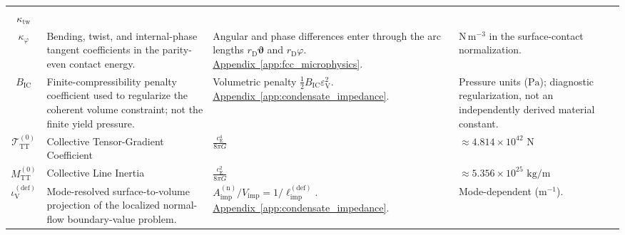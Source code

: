 \begin{longtable}{@{} c p{5.5cm} p{4cm} p{3.5cm} @{}}
\begin{tabular}[c]{@{}c@{}}$\kappa_{\mathrm b}$ \\ $\kappa_{\mathrm{tw}}$ \\ $\kappa_\varphi$\end{tabular} & {\raggedright Bending, twist, and internal-phase tangent coefficients in the parity-even contact energy.\par} & {\raggedright Angular and phase differences enter through the arc lengths $r_{\mathrm D}\boldsymbol\vartheta$ and $r_{\mathrm D}\varphi$. \newline \hyperref[app:fcc_microphysics]{Appendix~\ref*{app:fcc_microphysics}}.\par} & {\raggedright $\mathrm{N\,m^{-3}}$ in the surface-contact normalization.\par} \\

$B_{\mathrm{IC}}$ & {\raggedright Finite-compressibility penalty coefficient used to regularize the coherent volume constraint; not the finite yield pressure.\par} & {\raggedright Volumetric penalty $\tfrac12B_{\mathrm{IC}}\varepsilon_{\mathrm V}^2$. \newline \hyperref[app:condensate_impedance]{Appendix~\ref*{app:condensate_impedance}}.\par} & {\raggedright Pressure units ($\mathrm{Pa}$); diagnostic regularization, not an independently derived material constant.\par} \\


$\mathcal{T}_{\mathrm{TT}}^{(0)}$ & Collective Tensor-Gradient Coefficient & $\frac{c_{\mathrm{E}}^4}{8\pi G}$ & $\approx 4.814 \times 10^{42} \text{ N}$ \\

$M_{\mathrm{TT}}^{(0)}$ & Collective Line Inertia & $\frac{c_{\mathrm{E}}^2}{8\pi G}$ & $\approx 5.356 \times 10^{25} \text{ kg/m}$ \\

$\iota_{\mathrm V}^{(\mathrm{def})}$ & {\raggedright Mode-resolved surface-to-volume projection of the localized normal-flow boundary-value problem.\par} & {\raggedright $A_{\mathrm{imp}}^{(\mathrm n)}/V_{\mathrm{imp}}=1/\ell_{\mathrm{imp}}^{(\mathrm{def})}$. \newline \hyperref[app:condensate_impedance]{Appendix~\ref*{app:condensate_impedance}}.\par} & {\raggedright Mode-dependent ($\mathrm{m^{-1}}$).\par} \\


\end{longtable}
